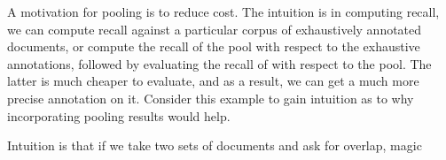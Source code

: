 A motivation for pooling is to reduce cost.
The intuition is in computing recall, we can compute recall against a particular corpus of exhaustively annotated documents,
or compute the recall of the pool with respect to the exhaustive annotations, followed by evaluating the recall of with respect to the pool. 
The latter is much cheaper to evaluate, and as a result, we can get a much more precise annotation on it.
Consider this example to gain intuition as to why incorporating pooling results would help.

Intuition is that if we take two sets of documents and ask for overlap, magic 

